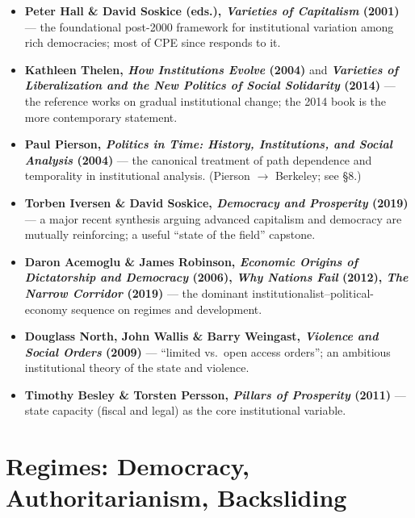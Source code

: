\documentclass[12pt]{article}
\begin{document}
\begin{itemize}[leftmargin=*, itemsep=4pt]
    \item \textbf{Peter Hall \& David Soskice (eds.), \textit{Varieties of Capitalism} (2001)} --- the foundational post-2000 framework for institutional variation among rich democracies; most of CPE since responds to it.
    \item \textbf{Kathleen Thelen, \textit{How Institutions Evolve} (2004)} and \textbf{\textit{Varieties of Liberalization and the New Politics of Social Solidarity} (2014)} --- the reference works on gradual institutional change; the 2014 book is the more contemporary statement.
    \item \textbf{Paul Pierson, \textit{Politics in Time: History, Institutions, and Social Analysis} (2004)} --- the canonical treatment of path dependence and temporality in institutional analysis. (Pierson $\rightarrow$ Berkeley; see \S8.)
    \item \textbf{Torben Iversen \& David Soskice, \textit{Democracy and Prosperity} (2019)} --- a major recent synthesis arguing advanced capitalism and democracy are mutually reinforcing; a useful ``state of the field'' capstone.
    \item \textbf{Daron Acemoglu \& James Robinson, \textit{Economic Origins of Dictatorship and Democracy} (2006), \textit{Why Nations Fail} (2012), \textit{The Narrow Corridor} (2019)} --- the dominant institutionalist--political-economy sequence on regimes and development.
    \item \textbf{Douglass North, John Wallis \& Barry Weingast, \textit{Violence and Social Orders} (2009)} --- ``limited vs.\ open access orders''; an ambitious institutional theory of the state and violence.
    \item \textbf{Timothy Besley \& Torsten Persson, \textit{Pillars of Prosperity} (2011)} --- state capacity (fiscal and legal) as the core institutional variable.
\end{itemize}

\section{Regimes: Democracy, Authoritarianism, Backsliding}
\end{document}
